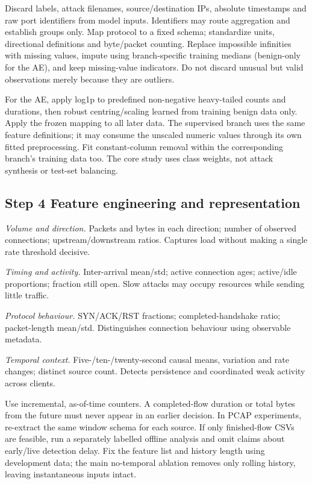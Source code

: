 \documentclass[conference]{IEEEtran}
\begin{document}
Discard labels, attack filenames, source/destination IPs, absolute timestamps and raw port identifiers from model inputs. Identifiers may route aggregation and establish groups only. Map protocol to a fixed schema; standardize units, directional definitions and byte/packet counting. Replace impossible infinities with missing values, impute using branch-specific training medians (benign-only for the AE), and keep missing-value indicators. Do not discard unusual but valid observations merely because they are outliers.

For the AE, apply log1p to predefined non-negative heavy-tailed counts and durations, then robust centring/scaling learned from training benign data only. Apply the frozen mapping to all later data. The supervised branch uses the same feature definitions; it may consume the unscaled numeric values through its own fitted preprocessing. Fit constant-column removal within the corresponding branch's training data too. The core study uses class weights, not attack synthesis or test-set balancing.

\subsection{Step 4 Feature engineering and representation}
\noindent\textit{Volume and direction.} Packets and bytes in each direction; number of observed connections; upstream/downstream ratios. Captures load without making a single rate threshold decisive.

\noindent\textit{Timing and activity.} Inter-arrival mean/std; active connection ages; active/idle proportions; fraction still open. Slow attacks may occupy resources while sending little traffic.

\noindent\textit{Protocol behaviour.} SYN/ACK/RST fractions; completed-handshake ratio; packet-length mean/std. Distinguishes connection behaviour using observable metadata.

\noindent\textit{Temporal context.} Five-/ten-/twenty-second causal means, variation and rate changes; distinct source count. Detects persistence and coordinated weak activity across clients.

Use incremental, as-of-time counters. A completed-flow duration or total bytes from the future must never appear in an earlier decision. In PCAP experiments, re-extract the same window schema for each source. If only finished-flow CSVs are feasible, run a separately labelled offline analysis and omit claims about early/live detection delay. Fix the feature list and history length using development data; the main no-temporal ablation removes only rolling history, leaving instantaneous inputs intact.
\end{document}
